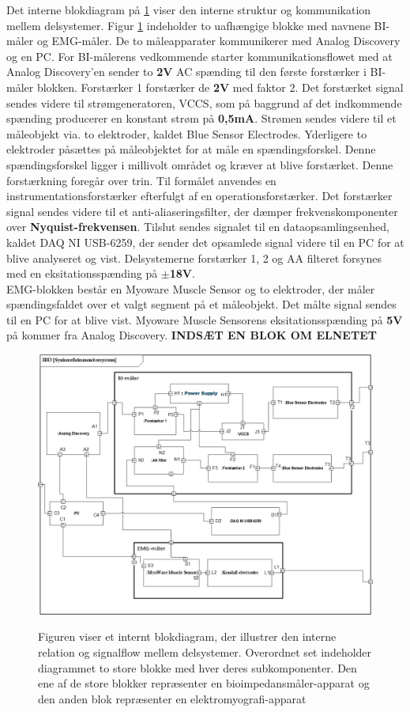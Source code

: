 Det interne blokdiagram på \ref{ibdfigur} viser den interne struktur og kommunikation mellem delsystemer. Figur \ref{ibdfigur} indeholder to uafhængige blokke med navnene BI-måler og EMG-måler. De to måleapparater kommunikerer med Analog Discovery og en PC. For BI-målerens vedkommende starter kommunikationsflowet med at Analog Discovery'en sender to \textbf{2V} AC spænding til den første forstærker i BI-måler blokken. Forstærker 1 forstærker de \textbf{2V} med faktor 2. Det forstærket signal sendes videre til strømgeneratoren, VCCS, som på baggrund af det indkommende spænding producerer en konstant strøm på \textbf{0,5mA}. Strømen sendes videre til et måleobjekt via. to elektroder, kaldet Blue Sensor Electrodes.       Yderligere to elektroder påsættes på måleobjektet for at måle en spændingsforskel. Denne spændingsforskel ligger i millivolt området og kræver at blive forstærket. Denne forstærkning foregår over trin. Til formålet anvendes en instrumentationsforstærker efterfulgt af en operationsforstærker. Det forstærker signal sendes videre til et anti-aliaseringsfilter, der dæmper frekvenskomponenter over \textbf{Nyquist-frekvensen}. Tilslut sendes signalet til en dataopsamlingsenhed, kaldet DAQ NI USB-6259, der sender det opsamlede signal videre til en PC for at blive analyseret og vist. Delsystemerne forstærker 1, 2 og AA filteret forsynes med en eksitationsspænding på $ \pm  $\textbf{18V}. \\

EMG-blokken består en Myoware Muscle Sensor og to elektroder, der måler spændingsfaldet over et valgt segment på et måleobjekt. Det målte signal sendes til en PC for at blive vist. Myoware Muscle Sensorens eksitationsspænding på \textbf{5V} på  kommer fra Analog Discovery.   
					\textbf{INDSÆT EN BLOK OM ELNETET} 
\begin{figure}[H]
\centering
{\includegraphics[width=\linewidth]
{Figure/IBD}}
\caption{Figuren viser et internt blokdiagram, der illustrer den interne relation og signalflow mellem delsystemer. Overordnet set indeholder diagrammet to store blokke med hver deres subkomponenter. Den ene af de store blokker repræsenter en bioimpedansmåler-apparat og den anden blok repræsenter en elektromyografi-apparat }
\label{ibdfigur}
\end{figure}

